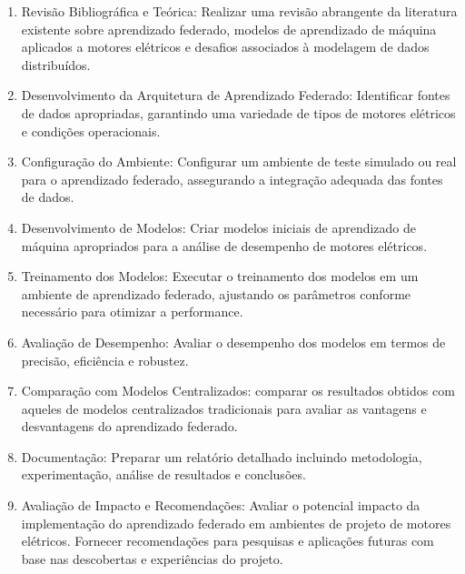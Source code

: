 \documentclass{article}
\begin{document}
\begin{enumerate}
    
\item Revisão Bibliográfica e Teórica: Realizar uma revisão abrangente da literatura existente sobre aprendizado federado, modelos de aprendizado de máquina aplicados a motores elétricos e desafios associados à modelagem de dados distribuídos.

\item Desenvolvimento da Arquitetura de Aprendizado Federado: Identificar fontes de dados apropriadas, garantindo uma variedade de tipos de motores elétricos e condições operacionais.

\item Configuração do Ambiente: Configurar um ambiente de teste simulado ou real para o aprendizado federado, assegurando a integração adequada das fontes de dados.

\item Desenvolvimento de Modelos: Criar modelos iniciais de aprendizado de máquina apropriados para a análise de desempenho de motores elétricos.

\item Treinamento dos Modelos: Executar o treinamento dos modelos em um ambiente de aprendizado federado, ajustando os parâmetros conforme necessário para otimizar a performance.

\item Avaliação de Desempenho: Avaliar o desempenho dos modelos em termos de precisão, eficiência e robustez.

\item Comparação com Modelos Centralizados: comparar os resultados obtidos com aqueles de modelos centralizados tradicionais para avaliar as vantagens e desvantagens do aprendizado federado.

\item Documentação: Preparar um relatório detalhado incluindo metodologia, experimentação, análise de resultados e conclusões.

\item Avaliação de Impacto e Recomendações: Avaliar o potencial impacto da implementação do aprendizado federado em ambientes de projeto de motores elétricos. Fornecer recomendações para pesquisas e aplicações futuras com base nas descobertas e experiências do projeto.

\end{enumerate}


   
 



\end{document}

